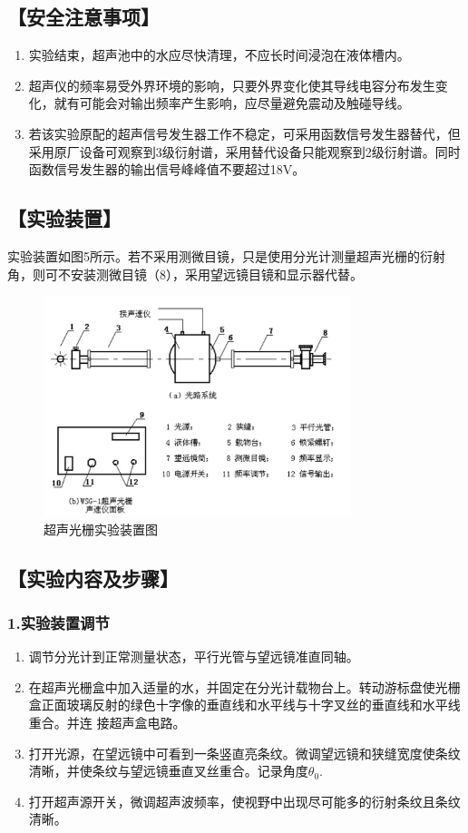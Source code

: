 \documentclass[12pt,a4paper,UTF8]{ctexart}
\begin{document}
\subsection*{【安全注意事项】}
    \begin{enumerate}
		\item 实验结束，超声池中的水应尽快清理，不应长时间浸泡在液体槽内。
		\item 超声仪的频率易受外界环境的影响，只要外界变化使其导线电容分布发生变化，就有可能会对输出频率产生影响，应尽量避免震动及触碰导线。
		\item 若该实验原配的超声信号发生器工作不稳定，可采用函数信号发生器替代，但采用原厂设备可观察到3级衍射谱，采用替代设备只能观察到2级衍射谱。同时函数信号发生器的输出信号峰峰值不要超过18V。
	\end{enumerate}

\subsection*{【实验装置】}
实验装置如图5所示。若不采用测微目镜，只是使用分光计测量超声光栅的衍射角，则可不安装测微目镜（8），采用望远镜目镜和显示器代替。
\begin{figure}[htbp]
	\centering
	\includegraphics[width=0.8\textwidth]{img//6.jpg}
	\caption{超声光栅实验装置图}
\end{figure}


\subsection*{【实验内容及步骤】}

\subsubsection*{1.实验装置调节}
    \begin{enumerate}
		\item 调节分光计到正常测量状态，平行光管与望远镜准直同轴。
		\item 在超声光栅盒中加入适量的水，并固定在分光计载物台上。转动游标盘使光栅盒正面玻璃反射的绿色十字像的垂直线和水平线与十字叉丝的垂直线和水平线重合。并连
		接超声盒电路。
		\item 打开光源，在望远镜中可看到一条竖直亮条纹。微调望远镜和狭缝宽度使条纹清晰，并使条纹与望远镜垂直叉丝重合。记录角度$\theta_0$.
		\item 打开超声源开关，微调超声波频率，使视野中出现尽可能多的衍射条纹且条纹清晰。
	\end{enumerate}
\end{document}
